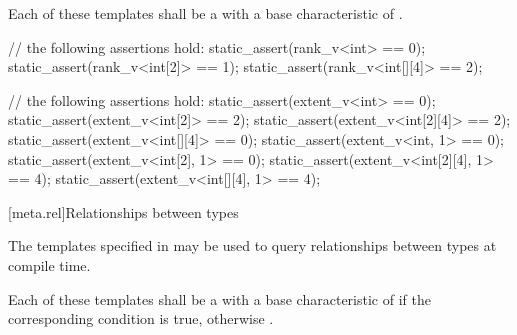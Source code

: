\pnum
Each of these templates shall be a  with a
base characteristic of .

\pnum
\begin{example}
\begin{codeblock}
// the following assertions hold:
static_assert(rank_v<int> == 0);
static_assert(rank_v<int[2]> == 1);
static_assert(rank_v<int[][4]> == 2);
\end{codeblock}
\end{example}

\pnum
\begin{example}
\begin{codeblock}
// the following assertions hold:
static_assert(extent_v<int> == 0);
static_assert(extent_v<int[2]> == 2);
static_assert(extent_v<int[2][4]> == 2);
static_assert(extent_v<int[][4]> == 0);
static_assert(extent_v<int, 1> == 0);
static_assert(extent_v<int[2], 1> == 0);
static_assert(extent_v<int[2][4], 1> == 4);
static_assert(extent_v<int[][4], 1> == 4);
\end{codeblock}
\end{example}

[meta.rel]{Relationships between types}

\pnum
The templates specified in 
may be used to query relationships between types at compile time.

\pnum
Each of these templates shall be a
with a base characteristic of
 if the corresponding condition is true, otherwise
.

